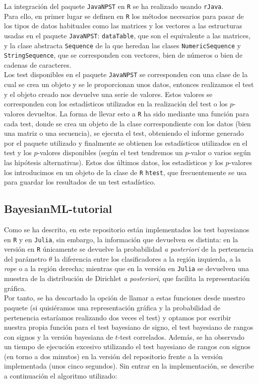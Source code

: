 	La integración del paquete \texttt{JavaNPST} en
\texttt{R} se ha realizado usando \texttt{rJava}.\\
Para ello, en primer lugar se definen en \texttt{R} los 
métodos necesarios para pasar de los tipos de datos 
habituales como las matrices y los vectores a las estructuras 
usadas en el paquete  \texttt{JavaNPST}: \texttt{dataTable}, 
que son el equivalente a las matrices, y la clase abstracta 
\texttt{Sequence}  de la que heredan las clases 
\texttt{NumericSequence} y \texttt{StringSequence}, que se 
corresponden con vectores, bien de números o bien de cadenas 
de caracteres.\\
	Los test disponibles en el paquete \texttt{JavaNPST} 
se corresponden con una clase de la cual se crea un 
objeto y se le proporcionan unos datos, entonces realizamos
el test y el objeto creado nos devuelve una serie de valores.
Estos valores se corresponden con los estadísticos utilizados
en la realización del test o los $p$-valores devueltos.
La forma de llevar esto a \texttt{R} ha sido mediante
una función para cada test, donde se crea un objeto
de la clase correspondiente con los datos (bien una matriz
o una secuencia), se ejecuta el test, obteniendo el informe
generado por el paquete utilizado y finalmente se obtienen 
los estadísticos utilizados en el test y los $p$-valores
disponibles (según el test tendremos un $p$-valor o 
varios según las hipótesis alternativas). Estos dos últimos
datos, los estadísticos y los $p$-valores los introducimos
en un objeto de la clase de \texttt{R} \texttt{htest},
que frecuentemente se usa para guardar los resultados de un
test estadístico.

\subsection*{BayesianML-tutorial}

	Como se ha descrito, en este repositorio están
implementados los test bayesianos en \texttt{R}
y en \texttt{Julia}, sin embargo, la información
que devuelven es distinta: en la versión en \texttt{R}
únicamente se devuelve la probabilidad \textit{a
posteriori} de la pertenencia del parámetro 
$\theta$ la diferencia entre los clasificadores
a la región izquierda, a la \textit{rope} o a la
región derecha; mientras que en la versión en
\texttt{Julia} se devuelven una muestra de 
la distribución de Dirichlet \textit{a posteriori},
que facilita la representación gráfica.\\
Por tanto, se ha descartado la opción de 
llamar a estas funciones desde nuestro paquete
(si quisiéramos una representación gráfica
y la probabilidad de pertenencia estaríamos
realizando dos veces el test) y optamos por
escribir nuestra propia función para el
test bayesiano de signo, el test bayesiano de 
rangos con signos y la versión bayesiana 
de $t$-test correlados. Además, se ha observado 	
un tiempo de ejecución excesivo utilizando
el test bayesiano de rangos con signos (en torno
a dos minutos) en la versión del repositorio
frente a la versión implementada (unos cinco
segundos). Sin entrar en la implementación, se 
describe a continuación el algoritmo utilizado:

